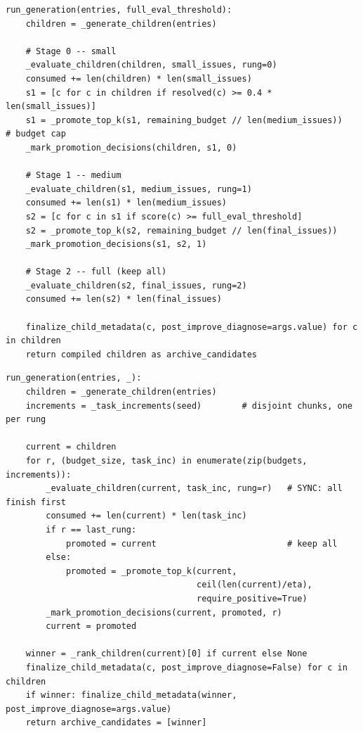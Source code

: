 \begin{lstlisting}[basicstyle=\ttfamily\footnotesize,columns=fullflexible,breaklines=true,caption={Baseline \texttt{run\_generation}: three sequential eval stages with quality gate plus budget cap.},label={lst:baseline-pseudo}]
run_generation(entries, full_eval_threshold):
    children = _generate_children(entries)

    # Stage 0 -- small
    _evaluate_children(children, small_issues, rung=0)
    consumed += len(children) * len(small_issues)
    s1 = [c for c in children if resolved(c) >= 0.4 * len(small_issues)]
    s1 = _promote_top_k(s1, remaining_budget // len(medium_issues))   # budget cap
    _mark_promotion_decisions(children, s1, 0)

    # Stage 1 -- medium
    _evaluate_children(s1, medium_issues, rung=1)
    consumed += len(s1) * len(medium_issues)
    s2 = [c for c in s1 if score(c) >= full_eval_threshold]
    s2 = _promote_top_k(s2, remaining_budget // len(final_issues))
    _mark_promotion_decisions(s1, s2, 1)

    # Stage 2 -- full (keep all)
    _evaluate_children(s2, final_issues, rung=2)
    consumed += len(s2) * len(final_issues)

    finalize_child_metadata(c, post_improve_diagnose=args.value) for c in children
    return compiled children as archive_candidates
\end{lstlisting}

\begin{lstlisting}[basicstyle=\ttfamily\footnotesize,columns=fullflexible,breaklines=true,caption={Hyperband \texttt{run\_generation}: synchronous SHA with disjoint per-rung task chunks.},label={lst:hyperband-pseudo}]
run_generation(entries, _):
    children = _generate_children(entries)
    increments = _task_increments(seed)        # disjoint chunks, one per rung

    current = children
    for r, (budget_size, task_inc) in enumerate(zip(budgets, increments)):
        _evaluate_children(current, task_inc, rung=r)   # SYNC: all finish first
        consumed += len(current) * len(task_inc)
        if r == last_rung:
            promoted = current                          # keep all
        else:
            promoted = _promote_top_k(current,
                                      ceil(len(current)/eta),
                                      require_positive=True)
        _mark_promotion_decisions(current, promoted, r)
        current = promoted

    winner = _rank_children(current)[0] if current else None
    finalize_child_metadata(c, post_improve_diagnose=False) for c in children
    if winner: finalize_child_metadata(winner, post_improve_diagnose=args.value)
    return archive_candidates = [winner]
\end{lstlisting}

